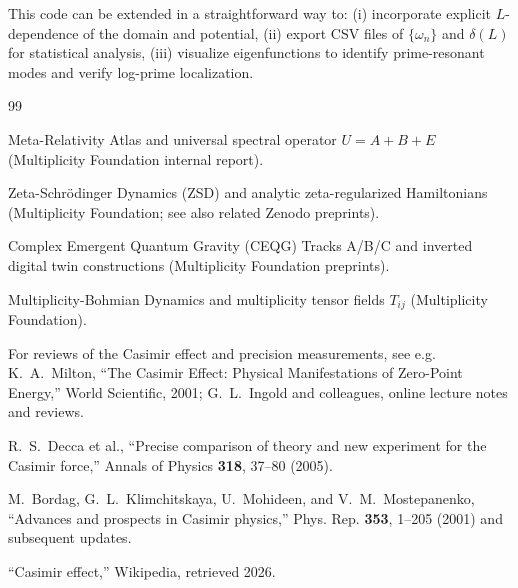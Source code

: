 \documentclass[11pt]{article}
\begin{document}
This code can be extended in a straightforward way to:
(i) incorporate explicit $L$-dependence of the domain and potential,
(ii) export CSV files of $\{\omega_n\}$ and $\delta(L)$ for statistical analysis,
(iii) visualize eigenfunctions to identify prime-resonant modes and verify log-prime localization.


\begin{thebibliography}{99}

Meta-Relativity Atlas and universal spectral operator $U=A+B+E$ (Multiplicity Foundation internal report).

Zeta-Schr\"odinger Dynamics (ZSD) and analytic zeta-regularized Hamiltonians (Multiplicity Foundation; see also related Zenodo preprints).

Complex Emergent Quantum Gravity (CEQG) Tracks A/B/C and inverted digital twin constructions (Multiplicity Foundation preprints).

Multiplicity-Bohmian Dynamics and multiplicity tensor fields $T_{ij}$ (Multiplicity Foundation).

For reviews of the Casimir effect and precision measurements, see e.g. K.~A.~Milton, ``The Casimir Effect: Physical Manifestations of Zero-Point Energy,'' World Scientific, 2001; G.~L.~Ingold and colleagues, online lecture notes and reviews.

R.~S.~Decca et al., ``Precise comparison of theory and new experiment for the Casimir force,'' Annals of Physics \textbf{318}, 37–80 (2005).

M.~Bordag, G.~L.~Klimchitskaya, U.~Mohideen, and V.~M.~Mostepanenko, ``Advances and prospects in Casimir physics,'' Phys. Rep. \textbf{353}, 1–205 (2001) and subsequent updates.

``Casimir effect,'' Wikipedia, retrieved 2026.

\end{thebibliography}
\end{document}

